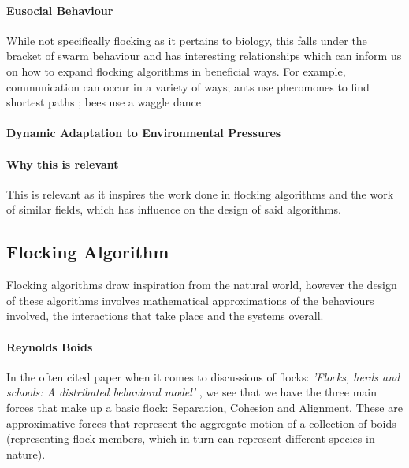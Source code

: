 	\paragraph{Eusocial Behaviour}
	While not specifically flocking as it pertains to biology, this falls under the bracket of swarm behaviour and has interesting relationships which can inform us on how to expand flocking algorithms in beneficial ways. For example, communication can occur in a variety of ways; ants use pheromones to find shortest paths \citep{DORIGO199773}; bees use a waggle dance %
	
	\paragraph{Dynamic Adaptation to Environmental Pressures}
	
	
	
	
	
	\paragraph{Why this is relevant}
	This is relevant as it inspires the work done in flocking algorithms and the work of similar fields, which has influence on the design of said algorithms. 


\subsection{Flocking Algorithm}
Flocking algorithms draw inspiration from the natural world, however the design of these algorithms involves mathematical approximations of the behaviours involved, the interactions that take place and the systems overall.

	\paragraph{Reynolds Boids}
	In the often cited paper when it comes to discussions of flocks: \textit{'Flocks, herds and schools: A distributed behavioral model'} \citet{Reynolds:1987:FHS:37402.37406}, we see that we have the three main forces that make up a basic flock: Separation, Cohesion and Alignment. These are approximative forces that represent the aggregate motion of a collection of boids (representing flock members, which in turn can represent different species in nature).
	
